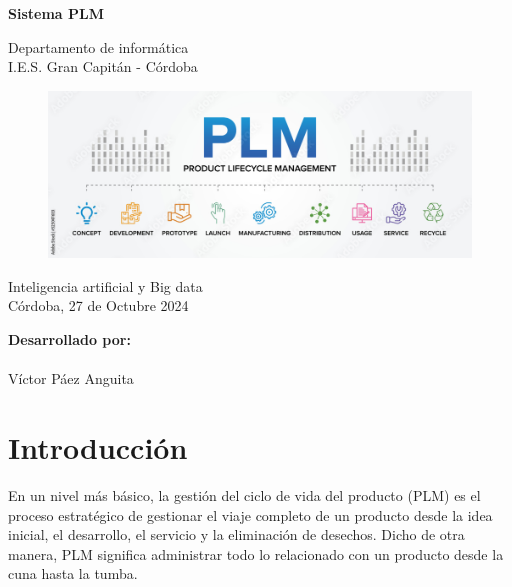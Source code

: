 \documentclass[12pt]{article}
\begin{document}
\begin{titlepage}
    \begin{center}
      \Large \bfseries{}
    \end{center}
    \vspace{0.1cm}
    \begin{center}
      \Large \bfseries{}
    \end{center}
    \vspace{0.1cm}
    \begin{center}
     \Large \bfseries{Sistema PLM}
    \end{center}
    \vspace{0.0001cm}
    \begin{center}
        Departamento de informática \\ I.E.S. Gran Capitán - Córdoba
    \end{center}
        \vspace{2 cm}
\begin{figure}[h!]
    \centering
    \includegraphics[width=.8\textwidth]{PLM.jpg}
    \label{fig:my_label}
\end{figure}
    \vspace{0.2 cm}
    \begin{center}
        Inteligencia artificial y Big data \\ Córdoba, 27 de Octubre 2024
    \end{center}
    \vspace{4 cm}
\null\hfill \textbf{Desarrollado por:}
\\
\\
\null\hfill Víctor Páez Anguita
\clearpage
\end{titlepage}

\tableofcontents
\clearpage

\section{Introducción}
En un nivel más básico, la gestión del ciclo de vida del producto (PLM) es el proceso estratégico de gestionar el viaje completo de un producto desde la idea inicial, 
el desarrollo, el servicio y la eliminación de desechos. Dicho de otra manera, PLM significa administrar todo lo relacionado con un producto desde la cuna hasta la tumba.
\end{document}
